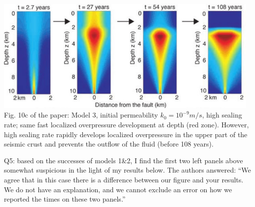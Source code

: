 \begin{center}
\includegraphics[width=13cm]{python_codes/fieldstone_126/images/grfr03_10c}\\
{\captionfont Fig. 10c of the paper:
Model 3, initial permeability $k_0 =10^{-9} m/s$, high sealing rate; same fast localized overpressure 
development at depth (red zone). However, high sealing rate rapidly develops localized overpressure 
in the upper part of the seismic crust and prevents the outflow of the fluid (before 108 years). }
\end{center}

{\color{red} Q5: based on the successes of models 1\&2, 
I find the first two left panels above somewhat suspicious in the 
light of my results below.}
The authors answered: ``We agree that in this case there is a difference between our 
figure and your results. We do not have an explanation, and we cannot exclude an error 
on how we reported the times on these two panels.''



